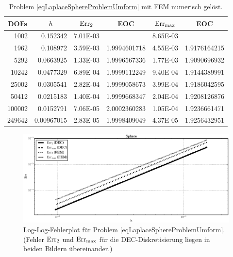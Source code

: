 \begin{beispiel}[Einheitssphäre]
       \begin{table}[htbp]
       \centering
       \begin{tabular}{|r|r|r|r|r|r|}
       \hline
       \multicolumn{1}{|c|}{DOFs} & \multicolumn{1}{c|}{\( h \)} & \multicolumn{1}{c|}{\( \text{Err}_{2} \)} & \multicolumn{1}{c|}{EOC} &
       \multicolumn{1}{c|}{ \( \text{Err}_{\max} \)} & \multicolumn{1}{c|}{EOC} \\ \hline
        1002 & 0.152342 & 7.01E-03 & \multicolumn{1}{l|}{} & 8.65E-03 & \multicolumn{1}{l|}{} \\ \hline
        1962 & 0.108972 & 3.59E-03 & 1.9994601718 & 4.55E-03 & 1.9176164215 \\ \hline
        5292 & 0.0663925 & 1.33E-03 & 1.9996567336 & 1.77E-03 & 1.9090696932 \\ \hline
        10242 & 0.0477329 & 6.89E-04 & 1.9999112249 & 9.40E-04 & 1.9144389991 \\ \hline
        25002 & 0.0305541 & 2.82E-04 & 1.9999058673 & 3.99E-04 & 1.9186042595 \\ \hline
        50412 & 0.0215183 & 1.40E-04 & 1.9999668347 & 2.04E-04 & 1.9208126876 \\ \hline
        100002 & 0.0152791 & 7.06E-05 & 2.0002360283 & 1.05E-04 & 1.9236661471 \\ \hline
        249642 & 0.00967015 & 2.83E-05 & 1.9998409049 & 4.37E-05 & 1.9256432951 \\ \hline
       \end{tabular}
       \caption[Laplace auf Sphäre (FEM)]{Problem \eqref{eqLaplaceSphereProblemUmform} mit FEM numerisch gelöst.}
       \label{tabLaplaceSphereFEM}
       \end{table}
      \begin{figure}
        \centering\includegraphics[width=\textwidth]{bilder/laplaceSphere/errplot.eps}
        \caption[Fehlerplot (Laplace auf Sphäre/Torus)]
                {Log-Log-Fehlerplot für Problem \eqref{eqLaplaceSphereProblemUmform}.
                 (Fehler \( \text{Err}_{2} \) und \( \text{Err}_{\max} \) für die DEC-Diskretisierung liegen 
                  in beiden Bildern übereinander.)}
        \label{figFehlerPlotLaplaceSphere}
      \end{figure}
    \end{beispiel}


